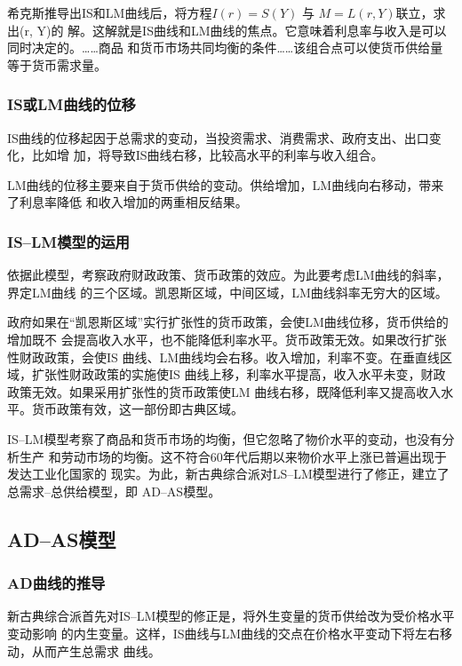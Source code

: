 希克斯推导出IS和LM曲线后，将方程$I(r) = S(Y)$ 与 $M = L (r,Y)$联立，求出(r, Y)的
解。这解就是IS曲线和LM曲线的焦点。它意味着利息率与收入是可以同时决定的。……商品
和货币市场共同均衡的条件……该组合点可以使货币供给量等于货币需求量。

\subsubsection{IS或LM曲线的位移}

IS曲线的位移起因于总需求的变动，当投资需求、消费需求、政府支出、出口变化，比如增
加，将导致IS曲线右移，比较高水平的利率与收入组合。

LM曲线的位移主要来自于货币供给的变动。供给增加，LM曲线向右移动，带来了利息率降低
和收入增加的两重相反结果。

\subsubsection{IS--LM模型的运用}

依据此模型，考察政府财政政策、货币政策的效应。为此要考虑LM曲线的斜率，界定LM曲线
的三个区域。凯恩斯区域，中间区域，LM曲线斜率无穷大的区域。

政府如果在“凯恩斯区域”实行扩张性的货币政策，会使LM曲线位移，货币供给的增加既不
会提高收入水平，也不能降低利率水平。货币政策无效。如果改行扩张性财政政策，会使IS
曲线、LM曲线均会右移。收入增加，利率不变。在垂直线区域，扩张性财政政策的实施使IS
曲线上移，利率水平提高，收入水平未变，财政政策无效。如果采用扩张性的货币政策使LM
曲线右移，既降低利率又提高收入水平。货币政策有效，这一部份即古典区域。

IS--LM模型考察了商品和货币市场的均衡，但它忽略了物价水平的变动，也没有分析生产
和劳动市场的均衡。这不符合60年代后期以来物价水平上涨已普遍出现于发达工业化国家的
现实。为此，新古典综合派对LS--LM模型进行了修正，建立了总需求--总供给模型，即
AD--AS模型。

\subsection{AD--AS模型}

\subsubsection{AD曲线的推导}

新古典综合派首先对IS--LM模型的修正是，将外生变量的货币供给改为受价格水平变动影响
的内生变量。这样，IS曲线与LM曲线的交点在价格水平变动下将左右移动，从而产生总需求
曲线。

